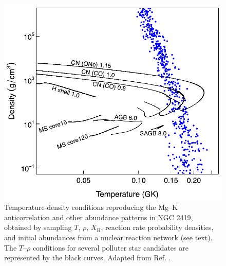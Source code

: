 \begin{figure}[t]
\centering
\includegraphics[width=4.5in]{Chapter-6/figs/Trho_Iliadis2016.png}
\caption{\label{fig:Trho_Iliadis}Temperature-density conditions reproducing the Mg--K anticorrelation and other abundance patterns in NGC 2419, obtained by sampling $T$, $\rho$, $X_{\mathrm{H}}$, reaction rate probability densities, and initial abundances from a nuclear reaction network (see text). The $T$--$\rho$ conditions for several polluter star candidates are represented by the black curves. Adapted from Ref. \cite{Iliadis2016}.}
\end{figure}

